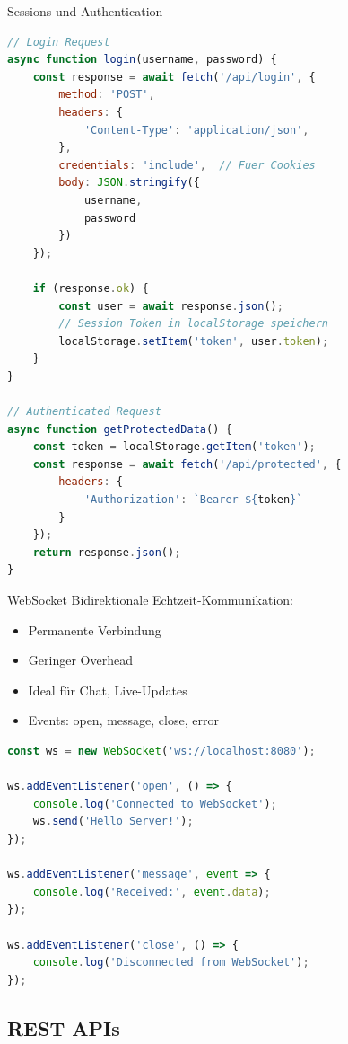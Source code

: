 \begin{KR}{Sessions und Authentication}
\begin{lstlisting}[language=JavaScript, style=basesmol]
// Login Request
async function login(username, password) {
    const response = await fetch('/api/login', {
        method: 'POST',
        headers: {
            'Content-Type': 'application/json',
        },
        credentials: 'include',  // Fuer Cookies
        body: JSON.stringify({
            username,
            password
        })
    });
    
    if (response.ok) {
        const user = await response.json();
        // Session Token in localStorage speichern
        localStorage.setItem('token', user.token);
    }
}

// Authenticated Request
async function getProtectedData() {
    const token = localStorage.getItem('token');
    const response = await fetch('/api/protected', {
        headers: {
            'Authorization': `Bearer ${token}`
        }
    });
    return response.json();
}
\end{lstlisting}
\end{KR}

\begin{concept}{WebSocket}
    Bidirektionale Echtzeit-Kommunikation:
    \begin{itemize}
        \item Permanente Verbindung
        \item Geringer Overhead
        \item Ideal für Chat, Live-Updates
        \item Events: open, message, close, error
    \end{itemize}

\begin{lstlisting}[language=JavaScript, style=basesmol]
const ws = new WebSocket('ws://localhost:8080');

ws.addEventListener('open', () => {
    console.log('Connected to WebSocket');
    ws.send('Hello Server!');
});

ws.addEventListener('message', event => {
    console.log('Received:', event.data);
});

ws.addEventListener('close', () => {
    console.log('Disconnected from WebSocket');
});
\end{lstlisting}
\end{concept}

\columnbreak

\subsection{REST APIs}

